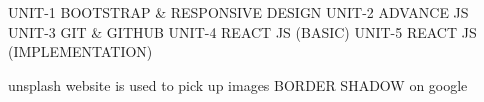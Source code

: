 UNIT-1   BOOTSTRAP & RESPONSIVE DESIGN
UNIT-2   ADVANCE JS
UNIT-3   GIT & GITHUB
UNIT-4   REACT JS (BASIC)
UNIT-5   REACT JS (IMPLEMENTATION)



unsplash website is used to pick up images
BORDER SHADOW on google
